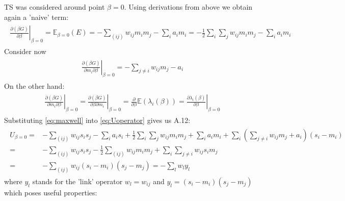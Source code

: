 \documentclass[../report/report.tex]{subfiles}
\begin{document}
TS was considered around point $\beta =0$. Using derivations from above we obtain again a 'naive' term:
\begin{align}
\begin{split}
\left. \frac{\partial (\beta G)}{\partial \beta} \right|_{\beta =0} = \mathbb{E} _{\beta = 0}(E) = - \sum_{(ij)} w_{ij} m_i m_j - \sum_i a_i m_i = - \frac{1}{2} \sum_i \sum_j w_{ij}m_i m_j - \sum_i a_i m_i
\end{split}
\end{align}
Consider now 
\begin{align}
\begin{split}
\left.\frac{\partial (\beta G)}{\partial m_i \partial \beta}\right|_{\beta = 0} = 
- \sum_{j \neq i} w_{ij} m_j - a_i
\end{split}
\end{align}
On the other hand:
\begin{align}
\begin{split}
\left. \frac{\partial (\beta G)}{\partial m_i \partial \beta}\right|_{\beta = 0} = \left. \frac{\partial (\beta G)}{\partial \beta \partial m_i }\right|_{\beta = 0} = \frac{\partial}{\partial \beta} \mathbb{E} (\lambda_i(\beta)) =  \left. \frac{\partial \lambda_i (\beta)}{\partial \beta}\right|_{\beta =0}
 \label{eq:maxwell}
 \end{split}
\end{align}
Substituting  \ref{eq:maxwell} into  \ref{eq:Uoperator} gives us A.12:
\begin{align}
\begin{split}
U_{\beta = 0} = & -\sum_{(ij)} w_{ij}s_is_j -\sum_i a_i s_i + \frac{1}{2} \sum_i \sum_j w_{ij} m_i m_j + \sum_i a_i m_i + \sum_i \left(\sum_{j \neq i} w_{ij} m_j  + a_i\right)(s_i - m_i ) \\
= & -\sum_{(ij)} w_{ij}s_i s_j - \frac{1}{2}\sum_{(ij)} w_{ij} m_i m_j + \sum_i \sum_{j \neq i} w_{ij} s_i m_j \\
= & - \sum_{(ij)} w_{ij} (s_i - m_i)(s_j- m_j) = - \sum_l w_l y_l
 \end{split}
\end{align}
where $y_l$ stands for the 'link' operator $w_l = w_{ij}$ and $y_l = (s_i -m_i)(s_j-m_j)$ which poses useful properties:
\end{document}
